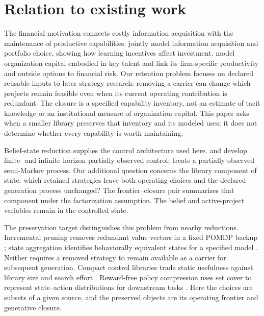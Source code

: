 \section{Relation to existing work}
\label{sec:literature}\label{sec:literature-boundary}

The financial motivation connects costly information acquisition with the
maintenance of productive capabilities. \citet{VanNieuwerburghVeldkamp2010}
jointly model information acquisition and portfolio choice, showing how
learning incentives affect investment. \citet{EisfeldtPapanikolaou2013}
model organization capital embodied in key talent and link its firm-specific
productivity and outside options to financial risk. Our retention problem
focuses on declared reusable inputs to later strategy research: removing a
carrier can change which projects remain feasible even when its current
operating contribution is redundant. The closure is a specified capability
inventory, not an estimate of tacit knowledge or an institutional measure of
organization capital. This paper asks when a smaller library preserves that
inventory and its modeled uses; it does not determine whether every capability
is worth maintaining.

Belief-state reduction supplies the control architecture used here.
\citet{SmallwoodSondik1973} and \citet{Sondik1978} develop finite- and
infinite-horizon partially observed control; \citet{White1976} treats a
partially observed semi-Markov process. Our additional question concerns the
library component of state: which retained strategies leave both operating
choices and the declared generation process unchanged? The frontier--closure
pair summarizes that component under the factorization assumption. The belief
and active-project variables remain in the controlled state.

The preservation target distinguishes this problem from nearby reductions.
Incremental pruning removes redundant value vectors in a fixed POMDP backup
\citep{CassandraLittmanZhang1997}; state aggregation identifies behaviorally
equivalent states for a specified model \citep{GivanDeanGreig2003}. Neither
requires a removed strategy to remain available as a carrier for subsequent
generation. Compact control libraries trade static usefulness against library
size and search effort \citep{DeyEtAl2012}. Reward-free policy compression
uses set cover to represent state--action distributions for downstream tasks
\citep{MuttiDelColRestelli2022}. Here the choices are subsets of a given
source, and the preserved objects are its operating frontier and generative
closure.

